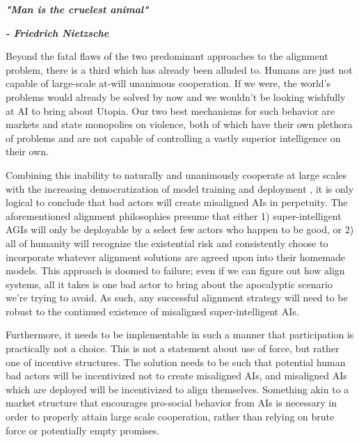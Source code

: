 \documentclass{article}
\begin{document}
\noindent \begin{center}\begin{minipage}[t]{0.9\columnwidth}
    \textbf{\textit{"Man is the cruelest animal"}}\par
    \textbf{\textit{- Friedrich Nietzsche}}
\end{minipage}\end{center} 
\vspace{0.05in}

Beyond the fatal flaws of the two predominant approaches to the alignment problem, there is a third which has already been alluded to.
Humans are just not capable of large-scale at-will unanimous cooperation.
If we were, the world's problems would already be solved by now and we wouldn't be looking wishfully at AI to bring about Utopia.
Our two best mechanisms for such behavior are markets and state monopolies on violence, both of which have their own plethora of problems and are not capable of controlling a vastly superior intelligence on their own.\par

Combining this inability to naturally and unanimously cooperate at large scales with the increasing democratization of model training and deployment \cite{noMoat}, it is only logical to conclude that bad actors will create misaligned AIs in perpetuity.
The aforementioned alignment philosophies presume that either 1) super-intelligent AGIs will only be deployable by a select few actors who happen to be good, or 2) all of humanity will recognize the existential risk and consistently choose to incorporate whatever alignment solutions are agreed upon into their homemade models.
This approach is doomed to failure; even if we can figure out how align systems, all it takes is one bad actor to bring about the apocalyptic scenario we're trying to avoid.
As such, any successful alignment strategy will need to be robust to the continued existence of misaligned super-intelligent AIs.\par

Furthermore, it needs to be implementable in such a manner that participation is practically not a choice.
This is not a statement about use of force, but rather one of incentive structures.
The solution needs to be such that potential human bad actors will be incentivized not to create misaligned AIs, and misaligned AIs which are deployed will be incentivized to align themselves.
Something akin to a market structure that encourages pro-social behavior from AIs is necessary in order to properly attain large scale cooperation, rather than relying on brute force or potentially empty promises.
\end{document}
